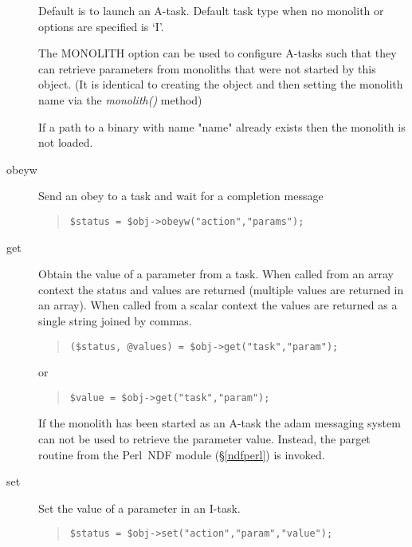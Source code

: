 \documentclass[twoside,11pt]{article}
\newenvironment{myquote}{\begin{quote}\begin{small}}{\end{small}\end{quote}}
\newcommand{\perl}{\xref{\textsf{Perl}}{sun193}{}}
\newcommand{\xref}[3]{#1}
\renewcommand{\_}{\texttt{\symbol{95}}}
\begin{document}
\begin{description}
Default is to launch an A-task. Default task type when no monolith
or options are specified is `I'.

The MONOLITH option can be used to configure A-tasks such that
they can retrieve parameters from monoliths that were not started by this
object. (It is identical to creating the object and then setting the
monolith name via the {\em monolith()\/} method)

If a path to a binary with name "name" already exists then the monolith
is not loaded.

\item[obeyw] \mbox{}

Send an obey to a task and wait for a completion message
\begin{myquote}
\begin{verbatim}
$status = $obj->obeyw("action","params");
\end{verbatim}
\end{myquote}

\item[get] \mbox{}

Obtain the value of a parameter from a task.
When called from an array context the status and values are returned
(multiple values are returned in an array). When called from a scalar
context the values are returned as a single string joined by commas.

\begin{myquote}
\begin{verbatim}
($status, @values) = $obj->get("task","param");
\end{verbatim}
\end{myquote}
or
\begin{myquote}
\begin{verbatim}
$value = $obj->get("task","param");
\end{verbatim}
\end{myquote}

If the monolith has been started as an A-task the adam messaging
system can not be used to retrieve the parameter value. Instead,
the par\_{}get routine from the \perl\ NDF module (\S\ref{ndfperl}) is invoked.

\item[set] \mbox{}


Set the value of a parameter in an I-task.
\begin{myquote}
\begin{verbatim}
$status = $obj->set("action","param","value");
\end{verbatim}
\end{myquote}


\end{description}
\end{document}
